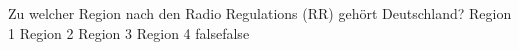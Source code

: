     {Zu welcher Region nach den Radio Regulations (RR) gehört Deutschland?}
    {Region 1}
    {Region 2}
    {Region 3}
    {Region 4}
    {false}{false}